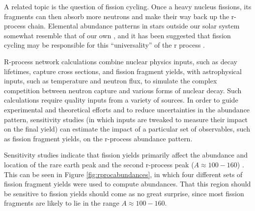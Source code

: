 A related topic is the question of fission cycling. Once a heavy nucleus fissions, its fragments can then absorb more neutrons and make their way back up the r-process chain. Elemental abundance patterns in stars outside our solar system somewhat resemble that of our own \cite{Arnould2007}, and it has been suggested that fission cycling may be responsible for this ``universality'' of the r process \cite{Beun2008}. %

R-process network calculations combine nuclear physics inputs, such as decay lifetimes, capture cross sections, and fission fragment yields, with astrophysical inputs, such as temperature and neutron flux, to simulate the complex competition between neutron capture and various forms of nuclear decay. Such calculations require quality inputs from a variety of sources. In order to guide experimental and theoretical efforts and to reduce uncertainties in the abundance pattern, sensitivity studies (in which inputs are tweaked to measure their impact on the final yield) can estimate the impact of a particular set of observables, such as fission fragment yields, on the r-process abundance pattern.

Sensitivity studies indicate that fission yields primarily affect the abundance and location of the rare earth peak and the second r-process peak ($A\approx100-160$) \cite{Goriely2015a, Eichler2015}. This can be seen in Figure \ref{fig:rprocabundances}, in which four different sets of fission fragment yields were used to compute abundances. That this region should be sensitive to fission yields should come as no great surprise, since most fission fragments are likely to lie in the range $A\approx100-160$.

